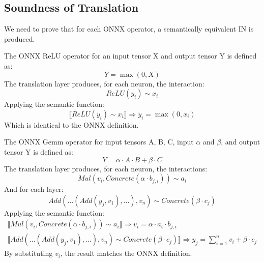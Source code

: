 \subsection{Soundness of Translation}
\label{sec:soundness-of-translation}

We need to prove that for each ONNX operator, a semantically equivalent IN is produced.

\begin{lemma}
The ONNX ReLU operator for an input tensor X and output tensor Y is defined as:
$$
Y = \max(0, X)
$$
The translation layer produces, for each neuron, the interaction:
$$
\mathit{ReLU}(y_i) \sim x_i
$$
Applying the semantic function:
$$
\llbracket \mathit{ReLU}(y_i) \sim x_i \rrbracket \Rightarrow y_i = \max(0, x_i)
$$
Which is identical to the ONNX definition.
\end{lemma}

\begin{lemma}
The ONNX Gemm operator for input tensors A, B, C, input $\alpha$ and $\beta$, and output tensor Y is defined as:
$$
Y = \alpha \cdot A \cdot B + \beta \cdot C
$$
The translation layer produces, for each neuron, the interactions:
$$
\mathit{Mul}(v_i, \mathit{Concrete}(\alpha \cdot b_{j, i})) \sim a_i
$$
And for each layer:
$$
\mathit{Add}(\dots(\mathit{Add}(y_j, v_1),\dots), v_n) \sim \mathit{Concrete}(\beta \cdot c_j)
$$
Applying the semantic function:
$$
\begin{aligned}
	\llbracket \mathit{Mul}(v_i, \mathit{Concrete}(\alpha \cdot b_{j, i})) \sim a_i \rrbracket \Rightarrow v_i = \alpha \cdot a_i \cdot b_{j, i}\\
	\llbracket \mathit{Add}(\dots(\mathit{Add}(y_j, v_1),\dots), v_n) \sim \mathit{Concrete}(\beta \cdot c_j) \rrbracket \Rightarrow y_j = \sum_{i=1}^n v_i + \beta \cdot c_j
\end{aligned}
$$
By substituting $v_i$, the result matches the ONNX definition.
\end{lemma}
